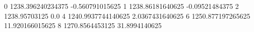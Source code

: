 0 1238.396240234375 -0.560791015625
1 1238.86181640625 -0.09521484375
2 1238.95703125 0.0
4 1240.9937744140625 2.0367431640625
6 1250.877197265625 11.920166015625
8 1270.8564453125 31.8994140625
